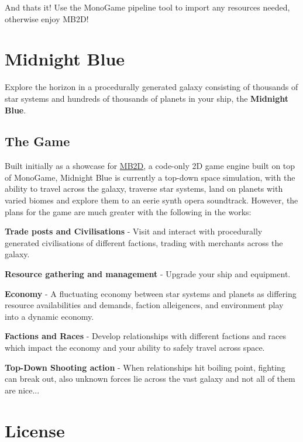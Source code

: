 And that\textquotesingle{}s it! Use the Mono\+Game pipeline tool to import any resources needed, otherwise enjoy M\+B2\+D! 



\section*{Midnight Blue}

Explore the horizon in a procedurally generated galaxy consisting of thousands of star systems and hundreds of thousands of planets in your ship, the {\bfseries Midnight Blue}.

\subsection*{The Game}

Built initially as a showcase for \hyperlink{namespace_m_b2_d}{M\+B2D}, a code-\/only 2D game engine built on top of Mono\+Game, Midnight Blue is currently a top-\/down space simulation, with the ability to travel across the galaxy, traverse star systems, land on planets with varied biomes and explore them to an eerie synth opera soundtrack. However, the plans for the game are much greater with the following in the works\+:


\begin{DoxyItemize}
\item {\bfseries Trade posts and Civilisations} -\/ Visit and interact with procedurally generated civilisations of different factions, trading with merchants across the galaxy.
\item {\bfseries Resource gathering and management} -\/ Upgrade your ship and equipment.
\item {\bfseries Economy} -\/ A fluctuating economy between star systems and planets as differing resource availabilities and demands, faction alleigences, and environment play into a dynamic economy.
\item {\bfseries Factions and Races} -\/ Develop relationships with different factions and races which impact the economy and your ability to safely travel across space.
\item {\bfseries Top-\/\+Down Shooting action} -\/ When relationships hit boiling point, fighting can break out, also unknown forces lie across the vast galaxy and not all of them are nice...
\end{DoxyItemize}

\section*{License}

